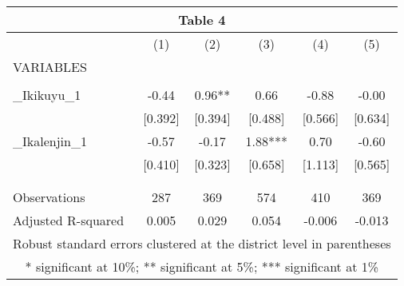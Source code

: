 \begin{tabular}{lccccc}
\multicolumn{6}{c}{Table 4} \\ \hline
 & (1) & (2) & (3) & (4) & (5) \\
VARIABLES &  &  &  &  &  \\ \hline
 &  &  &  &  &  \\
\_Ikikuyu\_1 & -0.44 & 0.96** & 0.66 & -0.88 & -0.00 \\
 & [0.392] & [0.394] & [0.488] & [0.566] & [0.634] \\
\_Ikalenjin\_1 & -0.57 & -0.17 & 1.88*** & 0.70 & -0.60 \\
 & [0.410] & [0.323] & [0.658] & [1.113] & [0.565] \\
 &  &  &  &  &  \\
 &  &  &  &  &  \\
Observations & 287 & 369 & 574 & 410 & 369 \\
 Adjusted R-squared & 0.005 & 0.029 & 0.054 & -0.006 & -0.013 \\ \hline
\multicolumn{6}{c}{ Robust standard errors clustered at the district level in parentheses} \\
\multicolumn{6}{c}{ * significant at 10\%; ** significant at 5\%; *** significant at 1\%} \\
\end{tabular}
